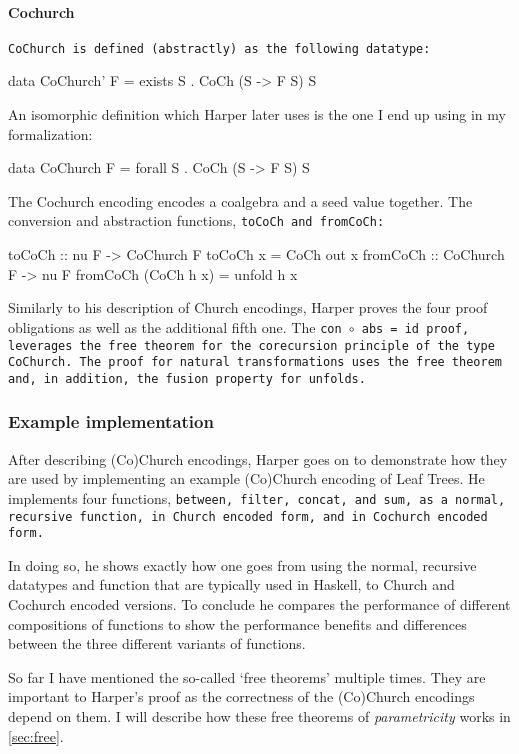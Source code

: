 \paragraph{Cochurch} \tt{CoChurch} is defined (abstractly) as the following datatype:
\begin{code}
data CoChurch' F = exists S . CoCh (S -> F S) S
\end{code}
An isomorphic definition which Harper later uses is the one I end up using in my formalization:
\begin{code}
data CoChurch F = forall S . CoCh (S -> F S) S
\end{code}
The Cochurch encoding encodes a coalgebra and a seed value together.
The conversion and abstraction functions, \tt{toCoCh} and \tt{fromCoCh}:
\begin{code}
toCoCh :: nu F -> CoChurch F
toCoCh x = CoCh out x
fromCoCh :: CoChurch F -> nu F
fromCoCh (CoCh h x) = unfold h x  
\end{code}
Similarly to his description of Church encodings, Harper proves the four proof obligations as well as the additional fifth one.
The \tt{con $\circ$ abs = id} proof, leverages the free theorem for the corecursion principle of the type \tt{CoChurch}.
The proof for natural transformations uses the free theorem and, in addition, the fusion property for unfolds.

\subsubsection{Example implementation}
After describing (Co)Church encodings, Harper goes on to demonstrate how they are used by implementing an example (Co)Church encoding of Leaf Trees.
He implements four functions, \tt{between}, \tt{filter}, \tt{concat}, and \tt{sum}, as a normal, recursive function, in Church encoded form, and in Cochurch encoded form.

In doing so, he shows exactly how one goes from using the normal, recursive datatypes and function that are typically used in Haskell, to Church and Cochurch encoded versions.
To conclude he compares the performance of different compositions of functions to show the performance benefits and differences between the three different variants of functions.

So far I have mentioned the so-called `free theorems' multiple times.
They are important to Harper's proof as the correctness of the (Co)Church encodings depend on them.
I will describe how these free theorems of \textit{parametricity} works in \autoref{sec:free}.

\iffalse
\begin{itemize}
    \Item 
\end{itemize}
\fi
